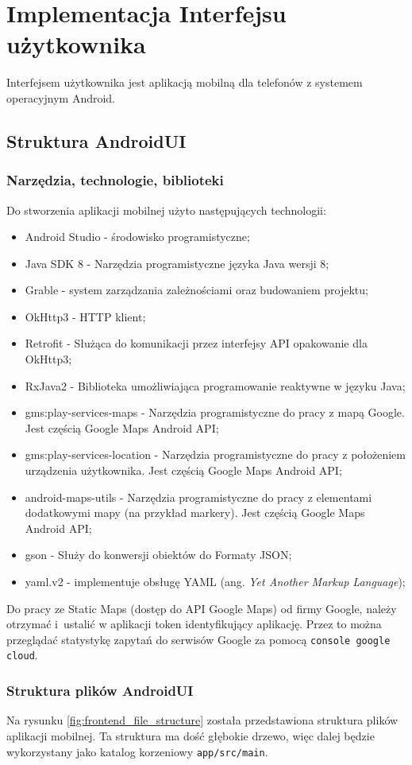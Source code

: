 %
\section{Implementacja Interfejsu użytkownika}
Interfejsem użytkownika jest aplikacją mobilną dla telefonów z systemem operacyjnym Android.
\subsection{Struktura AndroidUI}
\subsubsection{Narzędzia, technologie, biblioteki}
Do stworzenia aplikacji mobilnej użyto następujących technologii:
\begin{itemize}
    \item Android Studio - środowisko programistyczne;
    \item Java SDK 8 - Narzędzia programistyczne języka Java wersji 8;
    \item Grable - system zarządzania zależnościami oraz budowaniem projektu;
    \item OkHttp3 - HTTP klient;
    \item Retrofit - Służąca do komunikacji przez interfejsy API opakowanie dla OkHttp3;
    \item RxJava2 - Biblioteka umożliwiająca programowanie reaktywne w języku Java;
    \item gms:play-services-maps - Narzędzia programistyczne do pracy z mapą Google. Jest częścią Google Maps Android API;
    \item gms:play-services-location - Narzędzia programistyczne do pracy z położeniem urządzenia użytkownika. Jest częścią Google Maps Android API;
    \item android-maps-utils - Narzędzia programistyczne do pracy z elementami dodatkowymi mapy (na przykład markery). Jest częścią Google Maps Android API;
    \item gson - Służy do konwersji obiektów do Formaty JSON;
    \item yaml.v2 - implementuje obsługę YAML (ang. \textit{Yet Another Markup Language});
\end{itemize}

Do pracy ze Static Maps (dostęp do API Google Maps) od firmy Google, należy otrzymać i~ustalić w aplikacji token identyfikujący aplikację. Przez to można przeglądać statystykę zapytań do serwisów Google za pomocą \texttt{console google cloud}.
\subsubsection{Struktura plików AndroidUI}
Na rysunku \ref{fig:frontend_file_structure} została przedstawiona struktura plików aplikacji mobilnej. Ta struktura ma dość głębokie drzewo, więc dalej będzie wykorzystany jako katalog korzeniowy \texttt{app/src/main}.

